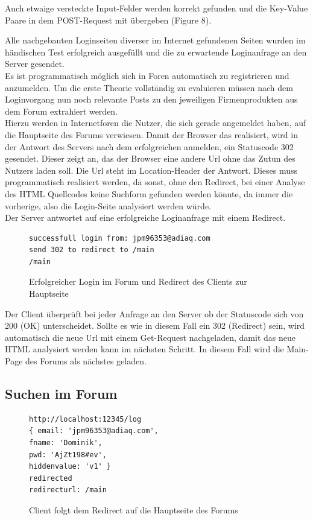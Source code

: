 Auch etwaige versteckte Input-Felder werden korrekt gefunden und die Key-Value Paare in dem POST-Request mit übergeben (Figure 8).
\newpage

Alle nachgebauten Loginseiten diverser im Internet gefundenen Seiten wurden im händischen Test erfolgreich ausgefüllt und die zu erwartende Loginanfrage an den Server gesendet.\\
Es ist programmatisch möglich sich in Foren automatisch zu registrieren und anzumelden. Um die erste Theorie vollständig zu evaluieren müssen nach dem Loginvorgang nun noch relevante Posts zu den jeweiligen Firmenprodukten aus dem Forum extrahiert werden.\\
Hierzu werden in Internetforen die Nutzer, die sich gerade angemeldet haben, auf die Hauptseite des Forums verwiesen. Damit der Browser das realisiert, wird in der Antwort des Servers nach dem erfolgreichen anmelden, ein Statuscode 302 gesendet. Dieser zeigt an, das der Browser eine andere Url ohne das Zutun des Nutzers laden soll. Die Url steht im Location-Header der Antwort. Dieses muss programmatisch realisiert werden, da sonst, ohne den Redirect, bei einer Analyse des HTML Quellcodes keine Suchform gefunden werden könnte, da immer die vorherige, also die Login-Seite analysiert werden würde.\\
Der Server antwortet auf eine erfolgreiche Loginanfrage mit einem Redirect.

\begin{figure}[ht]
\begin{lstlisting}[language=HTML5]
successfull login from: jpm96353@adiaq.com
send 302 to redirect to /main
/main
\end{lstlisting}
\caption{Erfolgreicher Login im Forum und Redirect des Clients zur Hauptseite}
\end{figure}

Der Client überprüft bei jeder Anfrage an den Server ob der Statuscode sich von 200 (OK) unterscheidet. Sollte es wie in diesem Fall ein 302 (Redirect) sein, wird automatisch die neue Url mit einem Get-Request nachgeladen, damit das neue HTML analysiert werden kann im nächsten Schritt. In diesem Fall wird die Main- Page des Forums als nächstes geladen.

\newpage

\subsection{Suchen im Forum}
\begin{figure}[ht]
\begin{lstlisting}[language=HTML5]
http://localhost:12345/log
{ email: 'jpm96353@adiaq.com',
fname: 'Dominik',
pwd: 'AjZt198#ev',
hiddenvalue: 'v1' }
redirected
redirecturl: /main
\end{lstlisting}
\caption{Client folgt dem Redirect auf die Hauptseite des Forums}
\end{figure}


